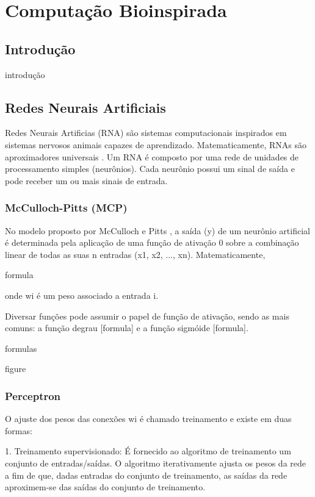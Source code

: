 \chapter{Computação Bioinspirada}
\label{bioinspirada}

\section{Introdução}

introdução

\section{Redes Neurais Artificiais}

Redes Neurais Artificias (RNA) são sistemas computacionais inspirados em sistemas
nervosos animais capazes de aprendizado. Matematicamente, RNAs são aproximadores
universais \cite{hornik89universal}. Um RNA é composto por uma rede de unidades
de processamento simples (neurônios). Cada neurônio possui um sinal de saída e
pode receber um ou mais sinais de entrada.

\subsection{McCulloch-Pitts (MCP)}

No modelo proposto por McCulloch e Pitts \cite{mcculloch43mcp}, a saída (y) de
um neurônio artificial é determinada pela aplicação de uma função de ativação 0
sobre a combinação linear de todas as suas n entradas (x1, x2, ..., xn).
Matematicamente,

formula

onde wi é um peso associado a entrada i.

Diversar funções pode assumir o papel de função de ativação, sendo as mais comuns:
a função degrau [formula] e a função sigmóide [formula].

formulas

figure

\subsection{Perceptron}

O ajuste dos pesos das conexões wi é chamado treinamento e existe em duas formas:

1. Treinamento supervisionado: É fornecido ao algoritmo de treinamento um
conjunto de entradas/saídas. O algoritmo iterativamente ajusta os pesos da rede
a fim de que, dadas entradas do conjunto de treinamento, as saídas da rede
aproximem-se das saídas do conjunto de treinamento.

